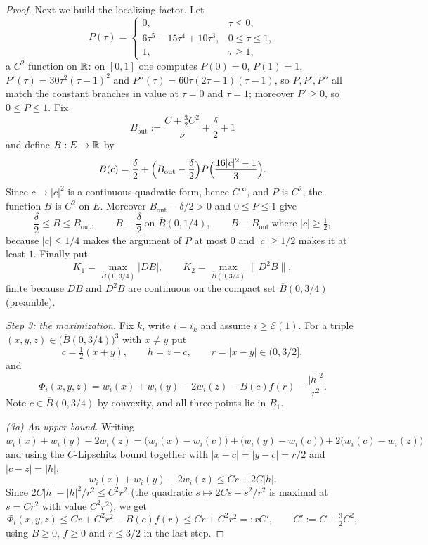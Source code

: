 \begin{proof}
Next we build the localizing factor. Let
\[
  P(\tau)=\begin{cases}0,&\tau\le0,\\
    6\tau^5-15\tau^4+10\tau^3,&0\le\tau\le1,\\ 1,&\tau\ge1,\end{cases}
\]
a $C^2$ function on $\mathbb{R}$: on $[0,1]$ one computes $P(0)=0$, $P(1)=1$,
$P'(\tau)=30\tau^2(\tau-1)^2$ and $P''(\tau)=60\tau(2\tau-1)(\tau-1)$, so
$P,P',P''$ all match the constant branches in value at $\tau=0$ and $\tau=1$;
moreover $P'\ge0$, so $0\le P\le1$. Fix
\[
  B_{\mathrm{out}}:=\frac{C+\tfrac32C^2}{\nu}+\frac{\delta}{2}+1
\]
and define $B:E\to\mathbb{R}$ by
\[
  B(c)=\frac\delta2+\Bigl(B_{\mathrm{out}}-\frac\delta2\Bigr)
        P\Bigl(\frac{16|c|^2-1}{3}\Bigr).
\]
Since $c\mapsto|c|^2$ is a continuous quadratic form, hence $C^\infty$, and $P$
is $C^2$, the function $B$ is $C^2$ on $E$. Moreover
$B_{\mathrm{out}}-\delta/2>0$ and $0\le P\le1$ give
\begin{equation}\label{eq:tpf-B}
  \frac\delta2\le B\le B_{\mathrm{out}},\qquad
  B\equiv\frac\delta2\ \text{on }\overline B(0,1/4),\qquad
  B\equiv B_{\mathrm{out}}\ \text{where }|c|\ge\tfrac12,
\end{equation}
because $|c|\le1/4$ makes the argument of $P$ at most $0$ and $|c|\ge1/2$ makes
it at least $1$. Finally put
\[
  K_1=\max_{\overline B(0,3/4)}|DB|,\qquad
  K_2=\max_{\overline B(0,3/4)}\|D^2B\| ,
\]
finite because $DB$ and $D^2B$ are continuous on the compact set
$\overline B(0,3/4)$ (preamble).

\emph{Step 3: the maximization.}
Fix $k$, write $i=i_k$ and assume $i\ge\mathcal E(1)$. For a triple
$(x,y,z)\in\bigl(\overline B(0,3/4)\bigr)^3$ with $x\ne y$ put
\[
  c=\tfrac12(x+y),\qquad h=z-c,\qquad r=|x-y|\in(0,3/2],
\]
and
\[
  \Phi_i(x,y,z)=w_i(x)+w_i(y)-2w_i(z)-B(c)f(r)-\frac{|h|^2}{r^2} .
\]
Note $c\in\overline B(0,3/4)$ by convexity, and all three points lie in $B_1$.

\emph{(3a) An upper bound.} Writing
$w_i(x)+w_i(y)-2w_i(z)=\bigl(w_i(x)-w_i(c)\bigr)+\bigl(w_i(y)-w_i(c)\bigr)
+2\bigl(w_i(c)-w_i(z)\bigr)$ and using the $C$-Lipschitz bound together with
$|x-c|=|y-c|=r/2$ and $|c-z|=|h|$,
\[
  w_i(x)+w_i(y)-2w_i(z)\le Cr+2C|h| .
\]
Since $2C|h|-|h|^2/r^2\le C^2r^2$ (the quadratic $s\mapsto2Cs-s^2/r^2$ is
maximal at $s=Cr^2$ with value $C^2r^2$), we get
\begin{equation}\label{eq:tpf-upper}
  \Phi_i(x,y,z)\le Cr+C^2r^2-B(c)f(r)
   \le Cr+C^2r^2=:rC',\qquad C':=C+\tfrac32C^2,
\end{equation}
using $B\ge0$, $f\ge0$ and $r\le3/2$ in the last step.


\end{proof}
